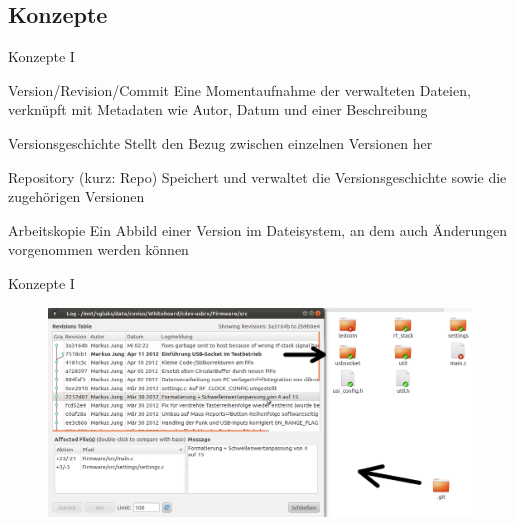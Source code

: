 \subsection{Konzepte}
\begin{frame}{Konzepte I}
	\begin{block}{Version/Revision/Commit}
		Eine Momentaufnahme der verwalteten Dateien, verknüpft mit Metadaten wie Autor, Datum und einer Beschreibung
	\end{block}
	\begin{block}{Versionsgeschichte}
		Stellt den Bezug zwischen einzelnen Versionen her
	\end{block}
	\begin{block}{Repository (kurz: Repo)}
		Speichert und verwaltet die Versionsgeschichte sowie die zugehörigen Versionen
	\end{block}
	\begin{block}{Arbeitskopie}
		Ein Abbild einer Version im Dateisystem, an dem auch Änderungen vorgenommen werden können
	\end{block}
\end{frame}
\begin{frame}{Konzepte I}
	\begin{figure}
		\includegraphics[width=\linewidth]{images/history.png}
	\end{figure}
\end{frame}
